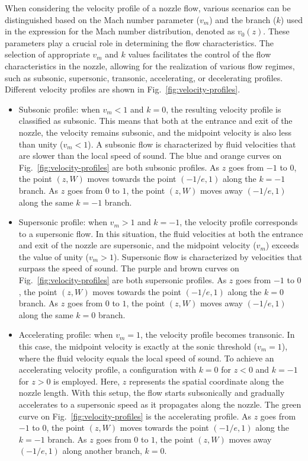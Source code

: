 When considering the velocity profile of a nozzle flow, various scenarios can be distinguished based on the Mach number parameter ($v_m$) and the branch ($k$) used in the expression for the Mach number distribution, denoted as $v_0(z)$. These parameters play a crucial role in determining the flow characteristics. The selection of appropriate $v_m$ and $k$ values facilitates the control of the flow characteristics in the nozzle, allowing for the realization of various flow regimes, such as subsonic, supersonic, transonic, accelerating, or decelerating profiles. Different velocity profiles are shown in Fig.~\ref{fig:velocity-profiles}.
\begin{itemize}
	\item Subsonic profile: when $v_m < 1$ and $k = 0$, the resulting velocity profile is classified as subsonic. This means that both at the entrance and exit of the nozzle, the velocity remains subsonic, and the midpoint velocity is also less than unity ($v_m < 1$). A subsonic flow is characterized by fluid velocities that are slower than the local speed of sound. The blue and orange curves on Fig.~\ref{fig:velocity-profiles} are both subsonic profiles. As $z$ goes from $-1$ to $0$, the point $(z,W)$ moves towards the point $(-1/e, 1)$ along the $k=-1$ branch. As $z$ goes from $0$ to $1$, the point $(z, W)$ moves away $(-1/e,1)$ along the same $k=-1$ branch.
	\item Supersonic profile: when $v_m > 1$ and $k = -1$, the velocity profile corresponds to a supersonic flow. In this situation, the fluid velocities at both the entrance and exit of the nozzle are supersonic, and the midpoint velocity ($v_m$) exceeds the value of unity ($v_m > 1$). Supersonic flow is characterized by velocities that surpass the speed of sound. The purple and brown curves on Fig.~\ref{fig:velocity-profiles} are both supersonic profiles. As $z$ goes from $-1$ to $0$, the point $(z,W)$ moves towards the point $(-1/e, 1)$ along the $k=0$ branch. As $z$ goes from $0$ to $1$, the point $(z, W)$ moves away $(-1/e,1)$ along the same $k=0$ branch.
	\item Accelerating profile: when $v_m = 1$, the velocity profile becomes transonic. In this case, the midpoint velocity is exactly at the sonic threshold ($v_m = 1$), where the fluid velocity equals the local speed of sound. To achieve an accelerating velocity profile, a configuration with $k = 0$ for $z < 0$ and $k = -1$ for $z > 0$ is employed. Here, $z$ represents the spatial coordinate along the nozzle length. With this setup, the flow starts subsonically and gradually accelerates to a supersonic speed as it propagates along the nozzle. The green curve on Fig.~\ref{fig:velocity-profiles} is the accelerating profile. As $z$ goes from $-1$ to $0$, the point $(z,W)$ moves towards the point $(-1/e, 1)$ along the $k=-1$ branch. As $z$ goes from $0$ to $1$, the point $(z, W)$ moves away $(-1/e,1)$ along another branch, $k=0$.

\end{itemize}
